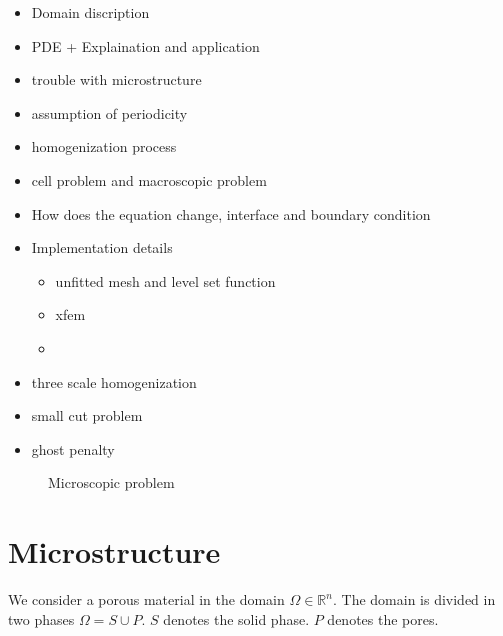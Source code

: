 \documentclass[10pt, a4paper]{article}
\begin{document}
\begin{itemize}
\item Domain discription
\item PDE + Explaination and application
\item trouble with microstructure
\item assumption of periodicity
\item homogenization process
\item cell problem and macroscopic problem
\item How does the equation change, interface and boundary condition
\item Implementation details
\begin{itemize}
\item unfitted mesh and level set function
\item xfem
\item 
\end{itemize}
\item three scale homogenization 
\item small cut problem
\item ghost penalty
\end{itemize}





\begin{figure}
	

	\caption{Microscopic problem }
\end{figure}
 
 \section{Microstructure}
 We consider a porous material in the domain $\Omega \in \mathbb{R}^n$. The domain is divided in two phases $\Omega = S \cup P$. $S$ denotes the solid phase. %
 $P$ denotes the pores.
 
\end{document}
